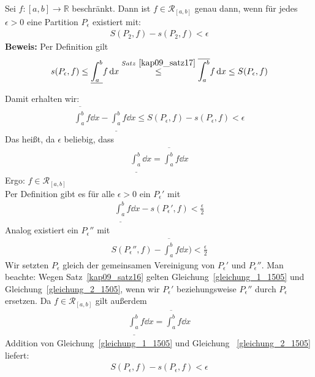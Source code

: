 \begin{Satz}{\label{kap_10_satz18}
	Sei $f: [a,b] \rightarrow \mathbb{R}$ beschränkt. Dann ist 
	$f \in \mathcal{R}_{[a,b]}$ genau dann, wenn für jedes $\epsilon > 0$ eine 
	Partition $P_{\epsilon}$ existiert mit:
	\begin{align*}
		S(P_2,f) - s(P_2,f) < \epsilon
	\end{align*}
	\textbf{Beweis:} Per Definition gilt 
	\begin{align*}
		s(P_{\epsilon},f) \leq \underline{\int_{a}^b} f \dd{x}
		\overset{Satz~\ref{kap09_satz17}}{\le} \overline{\int_a^b} f \dd{x} 
		\leq S(P_{\epsilon},f) 		
	\end{align*}

	Damit erhalten wir:
	\begin{align*}
		\overline{\int_a^b} f \dd{x} - 
		\underline{\int_{a}^b} f \dd{x} \leq S(P_{\epsilon},f) 
		- s(P_{\epsilon},f) < \epsilon
	\end{align*}
	Das heißt, da $\epsilon$ beliebig, dass
	\begin{align*}
		\underline{\int_{a}^b} \dd{x} = \overline{\int_a^b} f \dd{x}
	\end{align*}
	Ergo: $f \in \mathcal{R}_{[a,b]}$ \\
	Per Definition gibt es für alle $\epsilon > 0$ ein $P_{\epsilon}'$ mit 
	\begin{align}
		\label{gleichung_1_1505}
		\underline{\int_{a}^b} f \dd{x} - s(P_{\epsilon}',f) < \frac{\epsilon}{2} 
	\end{align}
	Analog existiert ein $P_{\epsilon}''$ mit 
	\begin{align}
		\label{gleichung_2_1505}
		S(P_{\epsilon}'',f) - \overline{\int_a^{b}} f \dd{x}) < \frac{\epsilon}{2}
	\end{align}
	Wir setzten $P_{\epsilon}$ gleich der gemeinsamen Vereinigung von 
	$P_{\epsilon}'$ und $P_{\epsilon}''$. Man beachte: Wegen Satz~\ref{kap09_satz16} 
	gelten Gleichung~\ref{gleichung_1_1505} und Gleichung~\ref{gleichung_2_1505},
	wenn wir $P_{\epsilon}'$ beziehungsweise $P_{\epsilon}''$ durch $P_{\epsilon}$
	ersetzen. Da $f \in \mathcal{R}_{[a,b]}$ gilt außerdem 
	\begin{align*}
		\underline{\int_{a}^b} f \dd{x} = \overline{\int_a^{b}} f\dd{x}
	\end{align*}	 
	Addition von Gleichung~\ref{gleichung_1_1505} und Gleichung~
	\ref{gleichung_2_1505} liefert:
	\begin{align*}
	S(P_{\epsilon},f) - s(P_{\epsilon},f) < \epsilon
	\end{align*}
}\end{Satz}

